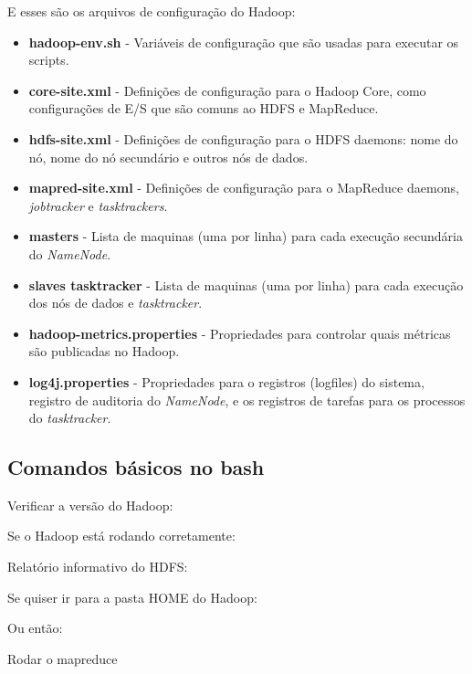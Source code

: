 \documentclass[a4paper,11pt]{article}
\begin{document}
E esses são os arquivos de configuração do Hadoop: \vspace{-1em}
\begin{itemize}
	\item \textbf{hadoop-env.sh} - Variáveis de configuração que são usadas para executar os scripts.
	\item \textbf{core-site.xml} - Definições de configuração para o Hadoop Core, como configurações de E/S que são comuns ao HDFS e MapReduce.
	\item \textbf{hdfs-site.xml} - Definições de configuração para o HDFS daemons: nome do nó, nome do nó secundário e outros nós de dados.
	\item \textbf{mapred-site.xml} - Definições de configuração para o MapReduce daemons, \textit{jobtracker} e \textit{tasktrackers}.
	\item \textbf{masters} - Lista de maquinas (uma por linha) para cada execução secundária do \textit{NameNode}.
	\item \textbf{slaves tasktracker} - Lista de maquinas (uma por linha) para cada execução dos nós de dados e \textit{tasktracker}.
	\item \textbf{hadoop-metrics.properties} - Propriedades para controlar quais métricas são publicadas no Hadoop.
	\item \textbf{log4j.properties} - Propriedades para o registros (logfiles) do sistema, registro de auditoria do \textit{NameNode}, e os registros de tarefas para os processos do \textit{tasktracker}.
\end{itemize}

\subsection{Comandos básicos no bash}
Verificar a versão do Hadoop: \\

Se o Hadoop está rodando corretamente: \\

Relatório informativo do HDFS: \\

Se quiser ir para a pasta HOME do Hadoop: \\

Ou então:

Rodar o mapreduce \\
\end{document}
